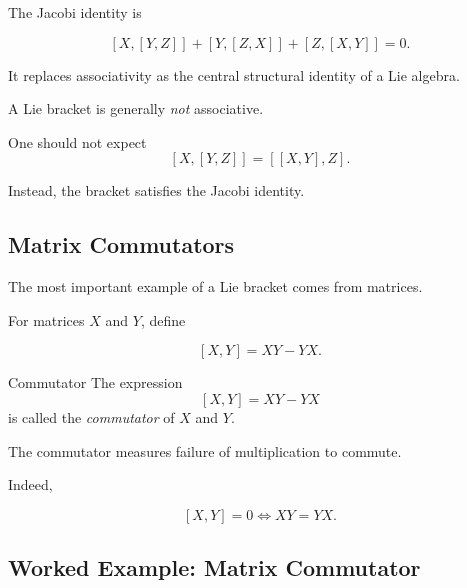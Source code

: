 The Jacobi identity is

\[ [X,[Y,Z]]+[Y,[Z,X]]+[Z,[X,Y]]=0. \]

It replaces associativity as the central structural identity of a Lie
algebra.

\begin{importantbox}
A Lie bracket is generally \emph{not} associative.

One should not expect
\[ [X,[Y,Z]]=[[X,Y],Z]. \]

Instead, the bracket satisfies the Jacobi identity.
\end{importantbox}

\subsection{Matrix Commutators}
\label{subsec:matrix-commutators}

The most important example of a Lie bracket comes from matrices.

For matrices \(X\) and \(Y\), define

\[ [X,Y]=XY-YX. \]

\begin{definitionbox}{Commutator}
The expression
\[ [X,Y]=XY-YX \]
is called the \emph{commutator} of \(X\) and \(Y\).
\end{definitionbox}

The commutator measures failure of multiplication to commute.

Indeed,

\[ [X,Y]=0\iff XY=YX. \]

\subsection{Worked Example: Matrix Commutator}
\label{subsec:worked-matrix-commutator}

